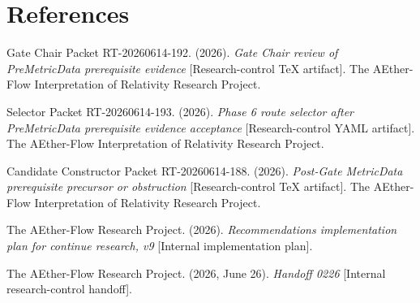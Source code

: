 \documentclass[11pt]{article}
\begin{document}
\section{References}

Gate Chair Packet RT-20260614-192. (2026). \textit{Gate Chair review of
PreMetricData prerequisite evidence} [Research-control TeX artifact]. The
AEther-Flow Interpretation of Relativity Research Project.

Selector Packet RT-20260614-193. (2026). \textit{Phase 6 route selector after
PreMetricData prerequisite evidence acceptance} [Research-control YAML
artifact]. The AEther-Flow Interpretation of Relativity Research Project.

Candidate Constructor Packet RT-20260614-188. (2026). \textit{Post-Gate
MetricData prerequisite precursor or obstruction} [Research-control TeX
artifact]. The AEther-Flow Interpretation of Relativity Research Project.

The AEther-Flow Research Project. (2026). \textit{Recommendations
implementation plan for continue research, v9} [Internal implementation
plan].

The AEther-Flow Research Project. (2026, June 26). \textit{Handoff 0226}
[Internal research-control handoff].
\end{document}
